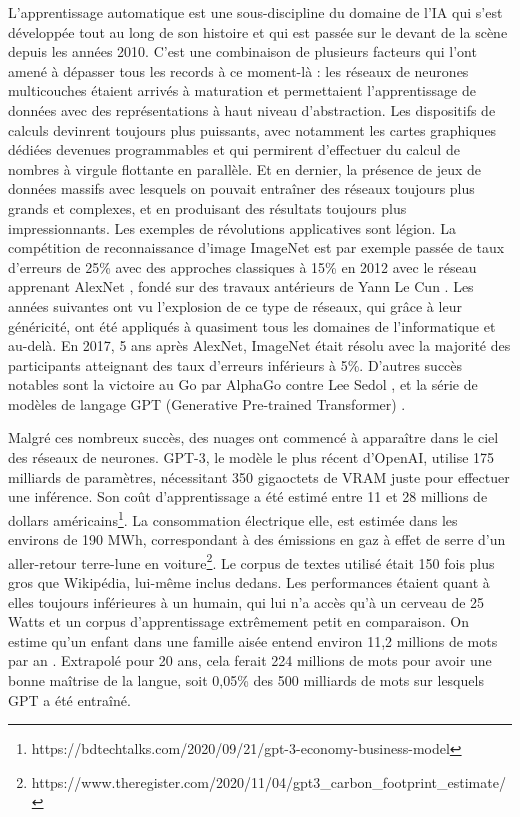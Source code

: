 	L'apprentissage automatique est une sous-discipline du domaine de l'IA qui s'est développée tout au long de son histoire et qui est passée sur le devant de la scène depuis les années 2010. C'est une combinaison de plusieurs facteurs qui l'ont amené à dépasser tous les records à ce moment-là : les réseaux de neurones multicouches étaient arrivés à maturation et permettaient l'apprentissage de données avec des représentations à haut niveau d'abstraction. Les dispositifs de calculs devinrent toujours plus puissants, avec notamment les cartes graphiques dédiées devenues programmables et qui permirent d'effectuer du calcul de nombres à virgule flottante en parallèle. Et en dernier, la présence de jeux de données massifs avec lesquels on pouvait entraîner des réseaux toujours plus grands et complexes, et en produisant des résultats toujours plus impressionnants. Les exemples de révolutions applicatives sont légion. La compétition de reconnaissance d'image ImageNet est par exemple passée de taux d'erreurs de 25\% avec des approches classiques à 15\% en 2012 avec le réseau apprenant AlexNet \cite{krizhevsky2012imagenet}, fondé sur des travaux antérieurs de Yann Le Cun \cite{lecun1989backpropagation}. Les années suivantes ont vu l'explosion de ce type de réseaux, qui grâce à leur généricité, ont été appliqués à quasiment tous les domaines de l'informatique et au-delà. En 2017, 5 ans après AlexNet, ImageNet était résolu avec la majorité des participants atteignant des taux d'erreurs inférieurs à 5\%. D'autres succès notables sont la victoire au Go par AlphaGo contre Lee Sedol \cite{silver2016mastering}, et la série de modèles de langage GPT (Generative Pre-trained Transformer) \cite{brown2020language}.

	Malgré ces nombreux succès, des nuages ont commencé à apparaître dans le ciel des réseaux de neurones. GPT-3, le modèle le plus récent d'OpenAI, utilise 175 milliards de paramètres, nécessitant 350 gigaoctets de VRAM juste pour effectuer une inférence. Son coût d'apprentissage a été estimé entre 11 et 28 millions de dollars américains\footnote{https://bdtechtalks.com/2020/09/21/gpt-3-economy-business-model}. La consommation électrique elle, est estimée dans les environs de 190 MWh, correspondant à des émissions en gaz à effet de serre d'un aller-retour terre-lune en voiture\footnote{https://www.theregister.com/2020/11/04/gpt3\_carbon\_footprint\_estimate/}. Le corpus de textes utilisé était 150 fois plus gros que Wikipédia, lui-même inclus dedans. Les performances étaient quant à elles toujours inférieures à un humain, qui lui n'a accès qu'à un cerveau de 25 Watts \cite{kandel2000principles} et un corpus d'apprentissage extrêmement petit en comparaison. On estime qu'un enfant dans une famille aisée entend environ 11,2 millions de mots par an \cite{hart2003early}. Extrapolé pour 20 ans, cela ferait 224 millions de mots pour avoir une bonne maîtrise de la langue, soit 0,05\% des 500 milliards de mots sur lesquels GPT a été entraîné.

